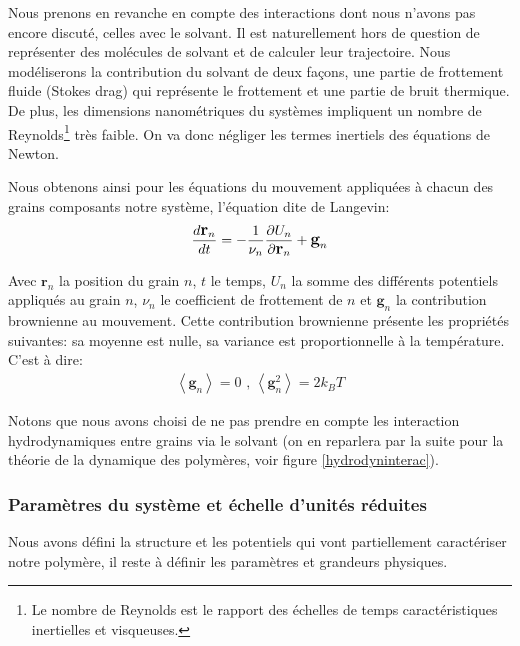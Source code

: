 \documentclass[a4paper,11pt]{article}
\begin{document}
Nous prenons en revanche en compte des interactions dont nous n'avons pas encore discuté, celles avec le solvant. Il est naturellement hors de question de représenter des molécules de solvant et de calculer leur trajectoire. Nous modéliserons la contribution du solvant de deux façons, une partie de frottement fluide (Stokes drag) qui représente le frottement et une partie de bruit thermique. De plus, les dimensions nanométriques du systèmes impliquent un nombre de Reynolds\footnote{Le nombre de Reynolds est le rapport des échelles de temps caractéristiques inertielles et visqueuses.} très faible. On va donc négliger les termes inertiels des équations de Newton.

Nous obtenons ainsi pour les équations du mouvement appliquées à chacun des grains composants notre système, l'équation dite de Langevin:
\begin{eqnarray}
\large{
\frac{d \textbf{r}_n}{dt} = - \frac{1}{\nu_n}\frac{\partial U_{n}}{\partial \textbf{r}_n}   + \textbf{g}_n}
\label{langevin}
\end{eqnarray}



Avec $\textbf{r}_n$ la position du grain $n$, $t$ le temps, $U_{n}$ la somme des différents potentiels appliqués au grain $n$, $\nu_n$ le coefficient de frottement de $n$ et $\textbf{g}_n$ la contribution brownienne au mouvement. Cette contribution brownienne présente les propriétés suivantes: sa moyenne est nulle, sa variance est proportionnelle à la température. C'est à dire:
\begin{eqnarray}
\left<\textbf{g}_n\right>\text{}=\text{} 0\text{ , } \left<\textbf{g}_n^2\right>\text{}=\text{} 2 k_B T
\end{eqnarray}

 Notons que nous avons choisi de ne pas prendre en compte les interaction hydrodynamiques entre grains via le solvant (on en reparlera par la suite pour la théorie de la dynamique des polymères, voir figure \ref{hydrodyninterac}).\\


\subsubsection*{Paramètres du système et échelle d'unités réduites}

Nous avons défini la structure et les potentiels qui vont partiellement caractériser notre polymère, il reste à définir les paramètres et grandeurs physiques.
\end{document}
